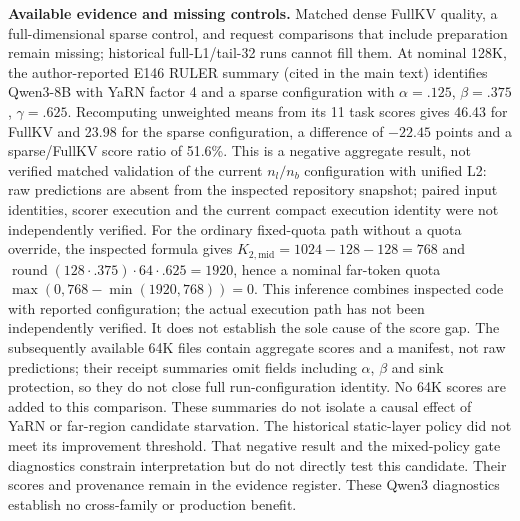 \documentclass[10pt,letterpaper]{article}
\begin{document}
\textbf{Available evidence and missing controls.} Matched dense FullKV quality, a full-dimensional sparse control, and request comparisons that include preparation remain missing; historical full-L1/tail-32 runs cannot fill them. At nominal 128K, the author-reported E146 RULER summary (cited in the main text) identifies Qwen3-8B with YaRN factor 4 and a sparse configuration with $\alpha=.125$, $\beta=.375$, $\gamma=.625$. Recomputing unweighted means from its 11 task scores gives 46.43 for FullKV and 23.98 for the sparse configuration, a difference of $-22.45$ points and a sparse/FullKV score ratio of 51.6\%. This is a negative aggregate result, not verified matched validation of the current $n_l/n_b$ configuration with unified L2: raw predictions are absent from the inspected repository snapshot; paired input identities, scorer execution and the current compact execution identity were not independently verified. For the ordinary fixed-quota path without a quota override, the inspected formula gives $K_{2,\mathrm{mid}}=1024-128-128=768$ and $\operatorname{round}(128\cdot .375)\cdot64\cdot .625=1920$, hence a nominal far-token quota $\max(0,768-\min(1920,768))\allowbreak{}=0$. This inference combines inspected code with reported configuration; the actual execution path has not been independently verified. It does not establish the sole cause of the score gap. The subsequently available 64K files contain aggregate scores and a manifest, not raw predictions; their receipt summaries omit fields including $\alpha$, $\beta$ and sink protection, so they do not close full run-configuration identity. No 64K scores are added to this comparison. These summaries do not isolate a causal effect of YaRN or far-region candidate starvation. The historical static-layer policy did not meet its improvement threshold. That negative result and the mixed-policy gate diagnostics constrain interpretation but do not directly test this candidate. Their scores and provenance remain in the evidence register. These Qwen3 diagnostics establish no cross-family or production benefit.
\end{document}
